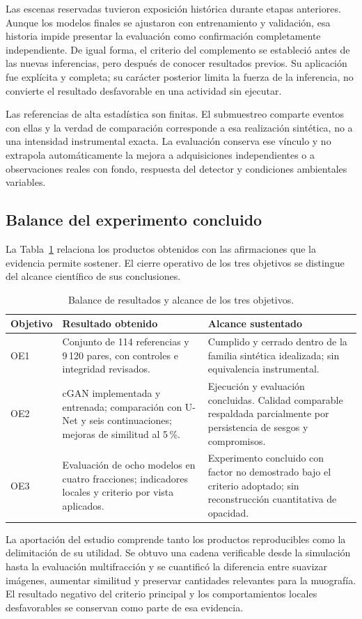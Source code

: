 Las escenas reservadas tuvieron exposición histórica durante etapas anteriores. Aunque los modelos finales se ajustaron con entrenamiento y validación, esa historia impide presentar la evaluación como confirmación completamente independiente. De igual forma, el criterio del complemento se estableció antes de las nuevas inferencias, pero después de conocer resultados previos. Su aplicación fue explícita y completa; su carácter posterior limita la fuerza de la inferencia, no convierte el resultado desfavorable en una actividad sin ejecutar.

Las referencias de alta estadística son finitas. El submuestreo comparte eventos con ellas y la verdad de comparación corresponde a esa realización sintética, no a una intensidad instrumental exacta. La evaluación conserva ese vínculo y no extrapola automáticamente la mejora a adquisiciones independientes o a observaciones reales con fondo, respuesta del detector y condiciones ambientales variables.

\subsection{Balance del experimento concluido}
La Tabla~\ref{tab:res-balance} relaciona los productos obtenidos con las afirmaciones que la evidencia permite sostener. El cierre operativo de los tres objetivos se distingue del alcance científico de sus conclusiones.
\begin{table}[!htbp]\centering\small
\caption{Balance de resultados y alcance de los tres objetivos.}\label{tab:res-balance}
\begin{tabularx}{\linewidth}{@{}p{1.5cm}>{\raggedright\arraybackslash}X>{\raggedright\arraybackslash}X@{}}\toprule
Objetivo & Resultado obtenido & Alcance sustentado\\\midrule
OE1 & Conjunto de 114 referencias y 9\,120 pares, con controles e integridad revisados. & Cumplido y cerrado dentro de la familia sintética idealizada; sin equivalencia instrumental.\\
OE2 & cGAN implementada y entrenada; comparación con U-Net y seis continuaciones; mejoras de similitud al 5\,\%. & Ejecución y evaluación concluidas. Calidad comparable respaldada parcialmente por persistencia de sesgos y compromisos.\\
OE3 & Evaluación de ocho modelos en cuatro fracciones; indicadores locales y criterio por vista aplicados. & Experimento concluido con factor no demostrado bajo el criterio adoptado; sin reconstrucción cuantitativa de opacidad.\\\bottomrule
\end{tabularx}\end{table}

La aportación del estudio comprende tanto los productos reproducibles como la delimitación de su utilidad. Se obtuvo una cadena verificable desde la simulación hasta la evaluación multifracción y se cuantificó la diferencia entre suavizar imágenes, aumentar similitud y preservar cantidades relevantes para la muografía. El resultado negativo del criterio principal y los comportamientos locales desfavorables se conservan como parte de esa evidencia.

\FloatBarrier
